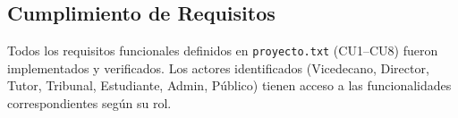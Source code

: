\subsection{Cumplimiento de Requisitos}

Todos los requisitos funcionales definidos en \texttt{proyecto.txt} (CU1--CU8) fueron implementados y verificados. Los actores identificados (Vicedecano, Director, Tutor, Tribunal, Estudiante, Admin, Público) tienen acceso a las funcionalidades correspondientes según su rol.

\endinput

